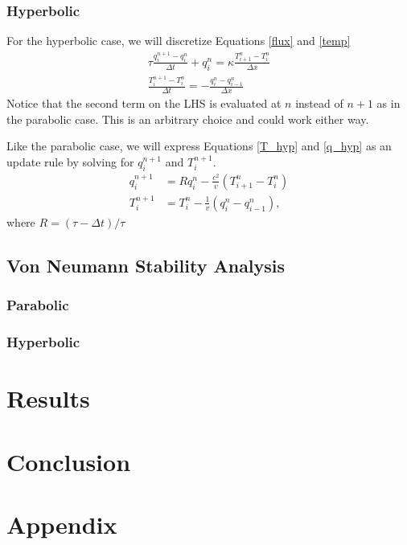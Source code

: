 \documentclass[iop]{emulateapj}
\begin{document}
			\subsubsection{Hyperbolic}
			
				For the hyperbolic case, we will discretize Equations \ref{flux} and \ref{temp}
				\begin{gather}
					\tau \frac{q_i^{n+1} - q_i^n}{\Delta t} + q_i^n =  \kappa \frac{T_{i+1}^n - T_i^n}{\Delta x} \label{q_hyp} \\
					\frac{T_i^{n+1} - T_i^n}{\Delta t} = - \frac{q_i^n - q_{i-1}^n}{\Delta x} \label{T_hyp}
				\end{gather}
				Notice that the second term on the \ac{LHS} is evaluated at $n$ instead of $n+1$ as in the parabolic case.
					This is an arbitrary choice and could work either way.
					
				Like the parabolic case, we will express Equations \ref{T_hyp} and \ref{q_hyp} as an update rule by solving for $q_i^{n+1}$ and $T_i^{n+1}$.
				\begin{align}
					q_i^{n+1} &= R q_i^n - \frac{c^2}{v} \left( T_{i+1}^n - T_i^n \right) \\
					T_i^{n+1} &= T_i^n - \frac{1}{v} \left( q_i^n - q_{i-1}^n \right),
				\end{align}
				where $R = (\tau - \Delta t) / \tau$
			
		\subsection{Von Neumann Stability Analysis}
			\subsubsection{Parabolic}
			\subsubsection{Hyperbolic}
	\section{Results}
	\section{Conclusion}
	\section{Appendix}
			
	
	
	
	\begin{acronym}
	\end{acronym}
	
\end{document}
